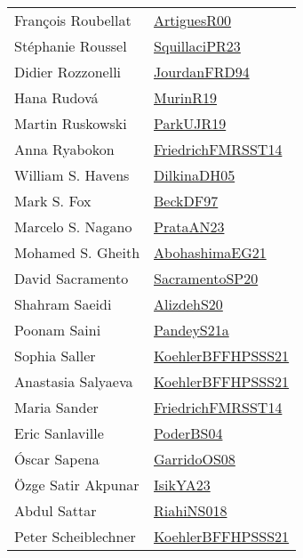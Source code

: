 {\begin{longtable}{p{4cm}p{20cm}}
Fran{\c{c}}ois Roubellat & \href{articles/ArtiguesR00.pdf}{ArtiguesR00}\cite{ArtiguesR00} \\
St{\'{e}}phanie Roussel & \href{papers/SquillaciPR23.pdf}{SquillaciPR23}\cite{SquillaciPR23} \\
Didier Rozzonelli & \href{papers/JourdanFRD94.pdf}{JourdanFRD94}\cite{JourdanFRD94} \\
Hana Rudov{\'{a}} & \href{papers/MurinR19.pdf}{MurinR19}\cite{MurinR19} \\
Martin Ruskowski & \href{papers/ParkUJR19.pdf}{ParkUJR19}\cite{ParkUJR19} \\
Anna Ryabokon & \href{papers/FriedrichFMRSST14.pdf}{FriedrichFMRSST14}\cite{FriedrichFMRSST14} \\
William S. Havens & \href{papers/DilkinaDH05.pdf}{DilkinaDH05}\cite{DilkinaDH05} \\
Mark S. Fox & \href{papers/BeckDF97.pdf}{BeckDF97}\cite{BeckDF97} \\
Marcelo S. Nagano & \href{articles/PrataAN23.pdf}{PrataAN23}\cite{PrataAN23} \\
Mohamed S. Gheith & \href{articles/AbohashimaEG21.pdf}{AbohashimaEG21}\cite{AbohashimaEG21} \\
David Sacramento & \href{articles/SacramentoSP20.pdf}{SacramentoSP20}\cite{SacramentoSP20} \\
Shahram Saeidi & \href{articles/AlizdehS20.pdf}{AlizdehS20}\cite{AlizdehS20} \\
Poonam Saini & \href{articles/PandeyS21a.pdf}{PandeyS21a}\cite{PandeyS21a} \\
Sophia Saller & \href{articles/KoehlerBFFHPSSS21.pdf}{KoehlerBFFHPSSS21}\cite{KoehlerBFFHPSSS21} \\
Anastasia Salyaeva & \href{articles/KoehlerBFFHPSSS21.pdf}{KoehlerBFFHPSSS21}\cite{KoehlerBFFHPSSS21} \\
Maria Sander & \href{papers/FriedrichFMRSST14.pdf}{FriedrichFMRSST14}\cite{FriedrichFMRSST14} \\
Eric Sanlaville & \href{articles/PoderBS04.pdf}{PoderBS04}\cite{PoderBS04} \\
{\'{O}}scar Sapena & \href{articles/GarridoOS08.pdf}{GarridoOS08}\cite{GarridoOS08} \\
{\"{O}}zge Satir Akpunar & \href{articles/IsikYA23.pdf}{IsikYA23}\cite{IsikYA23} \\
Abdul Sattar & \href{papers/RiahiNS018.pdf}{RiahiNS018}\cite{RiahiNS018} \\
Peter Scheiblechner & \href{articles/KoehlerBFFHPSSS21.pdf}{KoehlerBFFHPSSS21}\cite{KoehlerBFFHPSSS21} \\

\end{longtable}}
